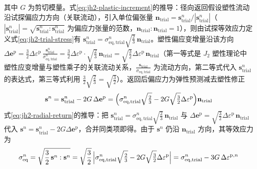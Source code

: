 其中 $G$ 为剪切模量。式\eqref{eq:jh2-plastic-increment}的推导：径向返回假设塑性流动沿试探偏应力方向（关联流动），引入单位偏张量 $\mathbf{n}_{\mathrm{trial}}=\mathbf{s}^{n}_{\mathrm{trial}}/|\mathbf{s}^{n}_{\mathrm{trial}}|$（$|\mathbf{s}^{n}_{\mathrm{trial}}|=\sqrt{\mathbf{s}^{n}_{\mathrm{trial}}:\mathbf{s}^{n}_{\mathrm{trial}}}$ 为偏应力张量的范数，$\mathbf{n}_{\mathrm{trial}}:\mathbf{n}_{\mathrm{trial}}=1$），则由试探等效应力定义式\eqref{eq:jh2-trial-stress}有 $\mathbf{s}^{n}_{\mathrm{trial}}=\sigma^{n}_{\mathrm{eq,trial}}\sqrt{\tfrac{2}{3}}\,\mathbf{n}_{\mathrm{trial}}$。塑性偏应变增量沿该方向 $\Delta\mathbf{e}^{\mathrm{p}}=\tfrac{3}{2}\Delta\varepsilon^{\mathrm{p}}\,\tfrac{\mathbf{s}^{n}_{\mathrm{trial}}}{\sigma^{n}_{\mathrm{eq,trial}}}=\tfrac{3}{2}\Delta\varepsilon^{\mathrm{p}}\cdot\sqrt{\tfrac{2}{3}}\,\mathbf{n}_{\mathrm{trial}}=\sqrt{\tfrac{3}{2}}\Delta\varepsilon^{\mathrm{p}}\,\mathbf{n}_{\mathrm{trial}}$（第一等式是 $J_{2}$ 塑性理论中塑性应变增量与塑性乘子的关联流动关系，$\tfrac{\mathbf{s}_{\mathrm{trial}}}{\sigma_{\mathrm{eq,trial}}}$ 为流动方向，第二等式代入 $\mathbf{s}^{n}_{\mathrm{trial}}$ 的表达式，第三等式利用 $\tfrac{3}{2}\sqrt{\tfrac{2}{3}}=\sqrt{\tfrac{3}{2}}$）。返回后偏应力为弹性预测减去塑性修正
\begin{equation}
  \mathbf{s}^{n}
  =\mathbf{s}^{n}_{\mathrm{trial}}-2G\,\Delta\mathbf{e}^{\mathrm{p}}
  =\Bigl(\sigma^{n}_{\mathrm{eq,trial}}\sqrt{\tfrac{2}{3}}-2G\sqrt{\tfrac{3}{2}}\Delta\varepsilon^{\mathrm{p}}\Bigr)\mathbf{n}_{\mathrm{trial}}
  \label{eq:jh2-radial-return}
\end{equation}
式\eqref{eq:jh2-radial-return}的推导：把 $\mathbf{s}^{n}_{\mathrm{trial}}=\sigma^{n}_{\mathrm{eq,trial}}\sqrt{\tfrac{2}{3}}\,\mathbf{n}_{\mathrm{trial}}$ 与 $\Delta\mathbf{e}^{\mathrm{p}}=\sqrt{\tfrac{3}{2}}\Delta\varepsilon^{\mathrm{p}}\,\mathbf{n}_{\mathrm{trial}}$ 代入 $\mathbf{s}^{n}=\mathbf{s}^{n}_{\mathrm{trial}}-2G\Delta\mathbf{e}^{\mathrm{p}}$，合并同类项即得。由于 $\mathbf{s}^{n}$ 仍沿 $\mathbf{n}_{\mathrm{trial}}$ 方向，其等效应力为
\begin{equation}
  \sigma^{n}_{\mathrm{eq}}
  =\sqrt{\frac{3}{2}\,\mathbf{s}^{n}:\mathbf{s}^{n}}
  =\sqrt{\frac{3}{2}}\,\Bigl|\sigma^{n}_{\mathrm{eq,trial}}\sqrt{\tfrac{2}{3}}-2G\sqrt{\tfrac{3}{2}}\Delta\varepsilon^{\mathrm{p}}\Bigr|
  =\sigma^{n}_{\mathrm{eq,trial}}-3G\,\Delta\varepsilon^{\mathrm{p},n}
  \label{eq:jh2-radial-return-seq}
\end{equation}
